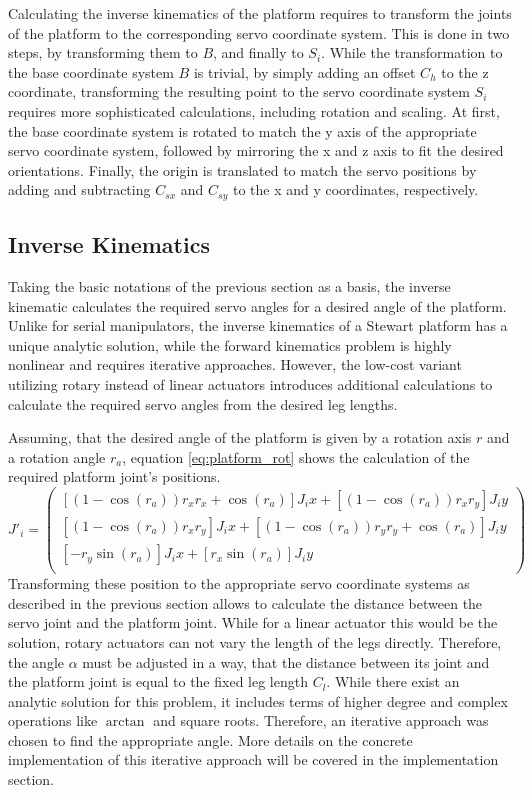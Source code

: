 Calculating the inverse kinematics of the platform requires to transform the
joints of the platform to the corresponding servo coordinate system. This is
done in two steps, by transforming them to $B$, and finally to $S_i$. While
the transformation to the base coordinate system $B$ is trivial, by simply
adding an offset $C_h$ to the z coordinate, transforming the resulting point
to the servo coordinate system $S_i$ requires more sophisticated calculations,
including rotation and scaling. At first, the base coordinate system is
rotated to match the y axis of the appropriate servo coordinate system,
followed by mirroring the x and z axis to fit the desired orientations.
Finally, the origin is translated to match the servo positions by adding and
subtracting $C_{sx}$ and $C_{sy}$ to the x and y coordinates, respectively.

\subsection{Inverse Kinematics}
Taking the basic notations of the previous section as a basis, the inverse
kinematic calculates the required servo angles for a desired angle of the
platform. Unlike for serial manipulators, the inverse kinematics of a Stewart
platform has a unique analytic solution, while the forward kinematics problem
is highly nonlinear and requires iterative approaches. However, the low-cost
variant utilizing rotary instead of linear actuators introduces additional
calculations to calculate the required servo angles from the desired leg
lengths.

Assuming, that the desired angle of the platform is given by a rotation axis
$r$ and a rotation angle $r_a$, equation \ref{eq:platform_rot} shows the
calculation of the required platform joint's positions.
\begin{equation}
J'_i = 
\begin{pmatrix}
\left[\left(1 - \cos(r_a)\right) r_x r_x + \cos(r_a)\right] J_ix + \left[\left(1 - \cos(r_a)\right) r_x r_y\right] J_iy\\
\left[\left(1 - \cos(r_a)\right) r_x r_y\right] J_ix + \left[\left(1 - \cos(r_a)\right) r_y r_y + \cos(r_a)\right] J_iy\\
\left[-r_y \sin(r_a)\right] J_ix + \left[r_x \sin(r_a)\right] J_iy\\
\end{pmatrix}
\label{eq:platform_rot}
\end{equation}
Transforming these position to the appropriate servo coordinate systems as
described in the previous section allows to calculate the distance between the
servo joint and the platform joint. While for a linear actuator this would be
the solution, rotary actuators can not vary the length of the legs directly.
Therefore, the angle $\alpha$ must be adjusted in a way, that the distance
between its joint and the platform joint is equal to the fixed leg length
$C_l$. While there exist an analytic solution for this problem, it includes
terms of higher degree and complex operations like $\arctan$ and square roots.
Therefore, an iterative approach was chosen to find the appropriate angle.
More details on the concrete implementation of this iterative approach will be
covered in the implementation section.

